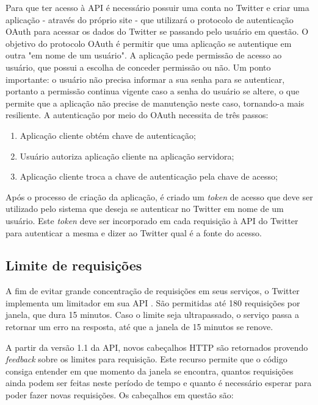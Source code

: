 Para que ter acesso à API é necessário possuir uma conta no Twitter e criar uma aplicação - através do próprio site \cite{twitterapp} - que utilizará o protocolo de autenticação OAuth\cite{oauth} para acessar os dados do Twitter se passando pelo usuário em questão. O objetivo do protocolo OAuth é permitir que uma aplicação se autentique em outra "em nome de um usuário". A aplicação pede permissão de acesso ao usuário, que possui a escolha de conceder permissão ou não. Um ponto importante: o usuário não precisa informar a sua senha para se autenticar, portanto a permissão continua vigente caso a senha do usuário se altere, o que permite que a aplicação não precise de manutenção neste caso, tornando-a mais resiliente. A autenticação por meio do OAuth necessita de três passos:

\begin{enumerate}
	\item Aplicação cliente obtém chave de autenticação;
	\item Usuário autoriza aplicação cliente na aplicação servidora;
	\item Aplicação cliente troca a chave de autenticação pela chave de acesso;
\end{enumerate}

Após o processo de criação da aplicação, é criado um \textit{token} de acesso que deve ser utilizado pelo sistema que deseja se autenticar no Twitter em nome de um usuário. Este \textit{token} deve ser incorporado em cada requisição à API do Twitter para autenticar a mesma e dizer ao Twitter qual é a fonte do acesso.

\subsection{Limite de requisições}
A fim de evitar grande concentração de requisições em seus serviços, o Twitter implementa um limitador em sua API \cite{twitterrequestlimit2016}. São permitidas até 180 requisições por janela, que dura 15 minutos. Caso o limite seja ultrapassado, o serviço passa a retornar um erro na resposta, até que a janela de 15 minutos se renove.

A partir da versão 1.1 da API, novos cabeçalhos \ac{HTTP} são retornados provendo \textit{feedback} sobre os limites para requisição. Este recurso permite que o código consiga entender em que momento da janela se encontra, quantos requisições ainda podem ser feitas neste período de tempo e quanto é necessário esperar para poder fazer novas requisições. Os cabeçalhos em questão são:

